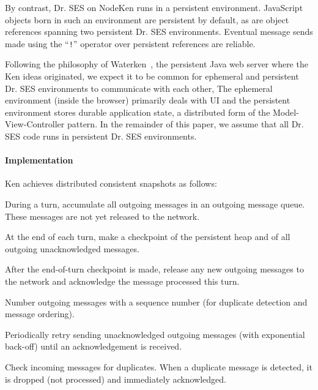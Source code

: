 \documentclass{llncs}
\begin{document}
By contrast, Dr. SES on NodeKen runs in a persistent environment. JavaScript objects born in such an environment are persistent by default, as are object references spanning two persistent Dr. SES environments. Eventual message sends made using the ``{\tt !}'' operator over persistent references are reliable.



Following the philosophy of Waterken~\cite{Close:Waterken}, the persistent Java web server where the Ken ideas originated, we expect it to be common for ephemeral and persistent Dr. SES environments to communicate with each other, The ephemeral environment (inside the browser) primarily deals with UI and the persistent environment stores durable application state, a distributed form of the Model-View-Controller pattern. In the remainder of this paper, we assume that all Dr. SES code runs in persistent Dr. SES environments.

\paragraph{Implementation} 

Ken achieves distributed consistent snapshots as follows:

\begin{itemize*}
  \item During a turn, accumulate all outgoing messages in an outgoing message queue. These messages are not yet released to the network.
  \item At the end of each turn, make a checkpoint of the persistent heap and of all outgoing unacknowledged messages.
  \item After the end-of-turn checkpoint is made, release any new outgoing messages to the network and acknowledge the message processed this turn.
  \item Number outgoing messages with a sequence number (for duplicate detection and message ordering).
  \item Periodically retry sending unacknowledged outgoing messages (with exponential back-off) until an acknowledgement is received.
  \item Check incoming messages for duplicates. When a duplicate message is detected, it is dropped (not processed) and immediately acknowledged.
\end{itemize*}
\end{document}
